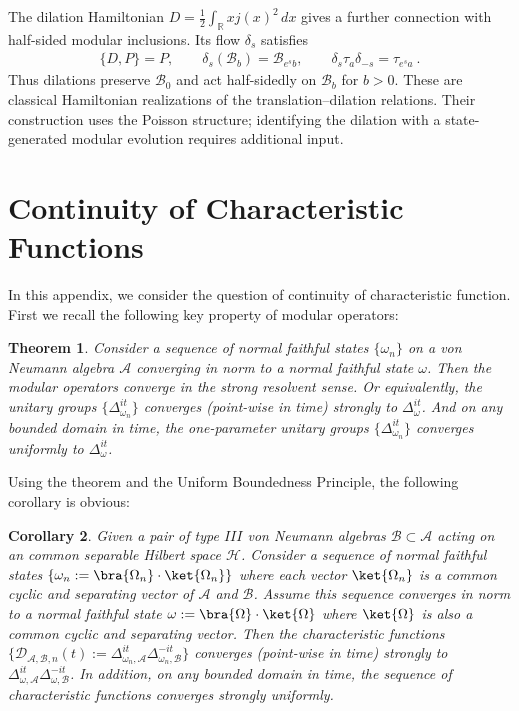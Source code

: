 \documentclass[a4paper,11pt]{article}
\newtheorem{theorem}{Theorem}
\newtheorem{corollary}[theorem]{Corollary}
\theoremstyle{definition}
\begin{document}
The dilation Hamiltonian $D=\frac12\int_{\mathbb R}xj(x)^2\,dx$ gives a further connection with half-sided modular inclusions. Its flow $\delta_s$ satisfies
\begin{align}
    \{D,P\}=P,
    \qquad \delta_s(\mathcal B_b)=\mathcal B_{e^s b},
    \qquad \delta_s\tau_a\delta_{-s}=\tau_{e^s a}\ .
\end{align}
Thus dilations preserve $\mathcal B_0$ and act half-sidedly on $\mathcal B_b$ for $b>0$. These are classical Hamiltonian realizations of the translation--dilation relations. Their construction uses the Poisson structure; identifying the dilation with a state-generated modular evolution requires additional input.


\section{Continuity of Characteristic Functions}\label{section:continuity}
In this appendix, we consider the question of continuity of characteristic function. First we recall the following key property of modular operators:
\begin{theorem}\label{theorem:continuityofmodular}
    Consider a sequence of normal faithful states $\{\omega_n\}$ on a von Neumann algebra $\mathcal{A}$ converging in norm to a normal faithful state $\omega$. Then the modular operators converge in the strong resolvent sense. Or equivalently, the unitary groups $\{\Delta_{\omega_n}^{it}\}$ converges (point-wise in time) strongly to $\Delta_\omega^{it}$. And on any bounded domain in time, the one-parameter unitary groups $\{\Delta_{\omega_n}^{it}\}$ converges uniformly to $\Delta_\omega^{it}$. 
\end{theorem}
Using the theorem and the Uniform Boundedness Principle, the following corollary is obvious:
\begin{corollary}\label{corollary:firstcorollary}
    Given a pair of type $III$ von Neumann algebras $\mathcal{B}\subset\mathcal{A}$ acting on an common separable Hilbert space $\mathcal{H}$. Consider a sequence of normal faithful states $\{\omega_n:=\bra{\Omega_n}\cdot\ket{\Omega_n}\}$ where each vector $\ket{\Omega_n}$ is a common cyclic and separating vector of $\mathcal{A}$ and $\mathcal{B}$. Assume this sequence converges in norm to a normal faithful state $\omega:=\bra{\Omega}\cdot\ket{\Omega}$ where $\ket{\Omega}$ is also a common cyclic and separating vector. Then the characteristic functions $\{\mathcal{D}_{\mathcal{A}, \mathcal{B}, n}(t) := \Delta_{\omega_n,\mathcal{A}}^{it}\Delta_{\omega_n, \mathcal{B}}^{-it}\}$ converges (point-wise in time) strongly to $\Delta_{\omega,\mathcal{A}}^{it}\Delta_{\omega,\mathcal{B}}^{-it}$. In addition, on any bounded domain in time, the sequence of characteristic functions converges strongly uniformly. 
\end{corollary}
\end{document}
